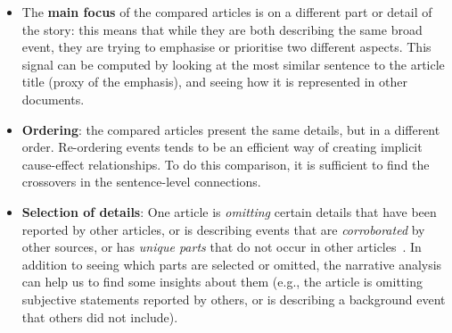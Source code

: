 \begin{itemize}
    \item The \textbf{main focus} of the compared articles is on a different part or detail of the story: this means that while they are both describing the same broad event, they are trying to emphasise or prioritise two different aspects.
    This signal can be computed by looking at the most similar sentence to the article title (proxy of the emphasis), and seeing how it is represented in other documents.
    
    \item \textbf{Ordering}: the compared articles present the same details, but in a different order.
    Re-ordering events tends to be an efficient way of creating implicit cause-effect relationships. 
    To do this comparison, it is sufficient to find the crossovers in the sentence-level connections.

    \item \textbf{Selection of details}:
    One article is \emph{omitting} certain details that have been reported by other articles, or is describing events that are \emph{corroborated} by other sources, or has \emph{unique parts} that do not occur in other articles~\cite{bountouridis2018explaining}.
    In addition to seeing which parts are selected or omitted, the narrative analysis can help us to find some insights about them (e.g., the article is omitting subjective statements reported by others, or is describing a background event that others did not include).
    

\end{itemize}
